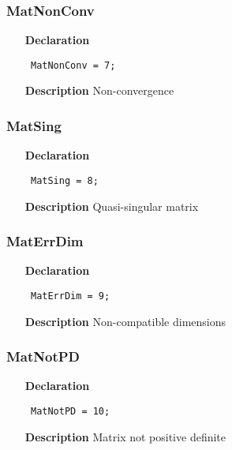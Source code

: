 \documentclass[12pt,a4paper,oneside]{report}
\newcommand{\declarationitem}[1]{\textbf{#1}}
\newcommand{\descriptiontitle}[1]{\textbf{#1}}
\newcommand{\code}[1]{\texttt{#1}}
\begin{document}
\subsubsection{MatNonConv}
\label{uErrors-MatNonConv}
\begin{itemize}\item[\declarationitem{Declaration}\hfill]
	\begin{flushleft}
		\code{
			MatNonConv = 7;}
		
	\end{flushleft}
	
	\par
	\item[\descriptiontitle{Description}]
	Non{-}convergence
	
\end{itemize}
\subsubsection{MatSing}
\label{uErrors-MatSing}
\begin{itemize}\item[\declarationitem{Declaration}\hfill]
	\begin{flushleft}
		\code{
			MatSing    = 8;}
		
	\end{flushleft}
	
	\par
	\item[\descriptiontitle{Description}]
	Quasi{-}singular matrix
	
\end{itemize}
\subsubsection{MatErrDim}
\label{uErrors-MatErrDim}
\begin{itemize}\item[\declarationitem{Declaration}\hfill]
	\begin{flushleft}
		\code{
			MatErrDim  = 9;}
		
	\end{flushleft}
	
	\par
	\item[\descriptiontitle{Description}]
	Non{-}compatible dimensions
	
\end{itemize}
\subsubsection{MatNotPD}
\label{uErrors-MatNotPD}
\begin{itemize}\item[\declarationitem{Declaration}\hfill]
	\begin{flushleft}
		\code{
			MatNotPD   = 10;}
		
	\end{flushleft}
	
	\par
	\item[\descriptiontitle{Description}]
	Matrix not positive definite
	
\end{itemize}
\end{document}
